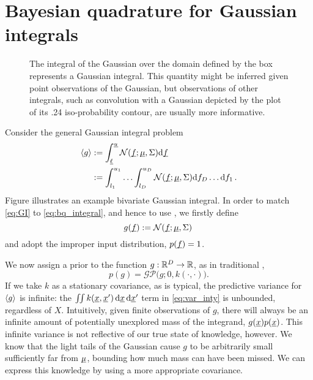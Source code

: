 \documentclass[twoside]{article}
\begin{document}
\section{Bayesian quadrature for Gaussian integrals}

\begin{figure}
\caption{The integral of the Gaussian over the domain defined by the box represents a Gaussian integral. This quantity might be inferred given point observations of the Gaussian, but observations of other integrals, such as convolution with a Gaussian depicted by the plot of its .24 iso-probability contour, are usually more informative.}
\label{fig:observations}
\end{figure}

Consider the general Gaussian integral problem 
\begin{align}\label{eq:GI}
\langle g \rangle & := \int_{\underline{\smash{\ell}}}^{\underline{\smash{u}}} \mathcal{N}(\underline{\smash{f}};\underline{\smash{\mu}},\Sigma) \mathrm{d} \underline{\smash{f}}\nonumber\\
& := \int_{l_1}^{u_1}\ldots\int_{l_D}^{u_D} \mathcal{N}(\underline{\smash{f}};\underline{\smash{\mu}},\Sigma) \mathrm{d} f_D \ldots \mathrm{d} f_1\,.
\end{align}
Figure \label{fig:observations} illustrates an example bivariate Gaussian integral. In order to match \eqref{eq:GI} to \eqref{eq:bq_integral}, and hence to use \bq, we firstly define 
\begin{equation}
 g(\underline{\smash{f}}) := \mathcal{N}(\underline{\smash{f}};\underline{\smash{\mu}},\Sigma)\,
\end{equation}
and adopt the improper input distribution, $p(\underline{\smash{f}}) = 1$. 

We now assign a \gp prior 
to the function $g: \mathbb{R}^D \to \mathbb{R}$, as in traditional \bq,
\begin{equation}
 p(g) = \mathcal{GP}\bigl(g; 0 , k(\cdot,\cdot)\bigr).
\end{equation}
 If we take $k$ as a stationary covariance, as is typical, the predictive variance for $\langle g \rangle$ is infinite: the $\iint k(\underline{\smash{x}},\underline{\smash{x}}')\,\mathrm{d}\underline{\smash{x}}\,\mathrm{d} \underline{\smash{x}}'$ term in \eqref{eq:var_inty} is unbounded, regardless of $X$. Intuitively, given finite observations of $g$, there will always be an infinite amount of potentially unexplored mass of the integrand, $g(\underline{\smash{x}})p(\underline{\smash{x}})$. This infinite variance is not reflective of our true state of knowledge, however. We know that the light tails of the Gaussian cause $g$ to be arbitrarily small sufficiently far from $\underline{\smash{\mu}}$, bounding how much mass can have been missed. We can express this knowledge by using a more appropriate covariance. 
\end{document}
